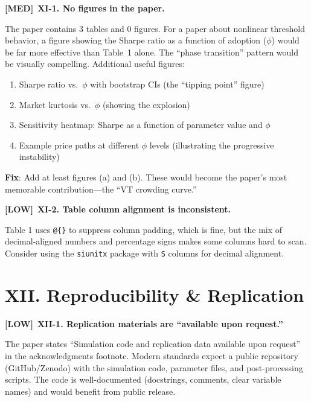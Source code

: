 \documentclass[12pt,a4paper]{article}
\newcommand{\MED}{\textbf{\textcolor{warncolor}{[MED]}}}
\newcommand{\LOW}{\textbf{\textcolor{okgreen}{[LOW]}}}
\begin{document}
\MED\ \textbf{XI-1. No figures in the paper.}

The paper contains 3 tables and 0 figures. For a paper about nonlinear threshold behavior, a figure showing the Sharpe ratio as a function of adoption ($\phi$) would be far more effective than Table~1 alone. The ``phase transition'' pattern would be visually compelling. Additional useful figures:

\begin{enumerate}[label=(\alph*)]
  \item Sharpe ratio vs.\ $\phi$ with bootstrap CIs (the ``tipping point'' figure)
  \item Market kurtosis vs.\ $\phi$ (showing the explosion)
  \item Sensitivity heatmap: Sharpe as a function of parameter value and $\phi$
  \item Example price paths at different $\phi$ levels (illustrating the progressive instability)
\end{enumerate}

\textbf{Fix}: Add at least figures (a) and (b). These would become the paper's most memorable contribution---the ``VT crowding curve.''

\medskip

\LOW\ \textbf{XI-2. Table column alignment is inconsistent.}

Table 1 uses \texttt{@\{\}} to suppress column padding, which is fine, but the mix of decimal-aligned numbers and percentage signs makes some columns hard to scan. Consider using the \texttt{siunitx} package with \texttt{S} columns for decimal alignment.


\section*{XII. Reproducibility \& Replication}

\LOW\ \textbf{XII-1. Replication materials are ``available upon request.''}

The paper states ``Simulation code and replication data available upon request'' in the acknowledgments footnote. Modern standards expect a public repository (GitHub/Zenodo) with the simulation code, parameter files, and post-processing scripts. The code is well-documented (docstrings, comments, clear variable names) and would benefit from public release.
\end{document}
